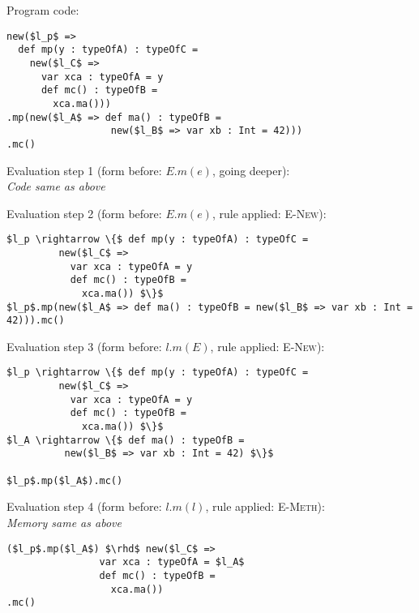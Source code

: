 \documentclass{llncs}
\begin{document}
\newpage

\noindent\underline{}

\vspace{16pt}

\noindent Program code:
\vspace{-6pt}
\begin{lstlisting}[xleftmargin=20pt]
new($l_p$ =>
  def mp(y : typeOfA) : typeOfC =
    new($l_C$ =>
      var xca : typeOfA = y
      def mc() : typeOfB =
        xca.ma()))
.mp(new($l_A$ => def ma() : typeOfB =
                  new($l_B$ => var xb : Int = 42)))
.mc()
\end{lstlisting}

\vspace{12pt}
\noindent Evaluation step 1 (form before: $E.m(e)$, going deeper):\\
\indent\textit{Code same as above}

\vspace{12pt}
\noindent Evaluation step 2 (form before: $E.m(e)$, rule applied: \textsc{E-New}):
\vspace{-6pt}
\begin{lstlisting}[xleftmargin=20pt]
$l_p \rightarrow \{$ def mp(y : typeOfA) : typeOfC =
         new($l_C$ =>
           var xca : typeOfA = y
           def mc() : typeOfB =
             xca.ma()) $\}$
$l_p$.mp(new($l_A$ => def ma() : typeOfB = new($l_B$ => var xb : Int = 42))).mc()
\end{lstlisting}

\vspace{12pt}
\noindent Evaluation step 3 (form before: $l.m(E)$, rule applied: \textsc{E-New}):
\vspace{-6pt}
\begin{lstlisting}[xleftmargin=20pt]
$l_p \rightarrow \{$ def mp(y : typeOfA) : typeOfC =
         new($l_C$ =>
           var xca : typeOfA = y
           def mc() : typeOfB =
             xca.ma()) $\}$
$l_A \rightarrow \{$ def ma() : typeOfB =
          new($l_B$ => var xb : Int = 42) $\}$

$l_p$.mp($l_A$).mc()
\end{lstlisting}

\vspace{12pt}
\noindent Evaluation step 4 (form before: $l.m(l)$, rule applied: \textsc{E-Meth}):\\
\vspace{-6pt}
\indent\textit{Memory same as above}\\
\vspace{-6pt}
\begin{lstlisting}[xleftmargin=20pt]
($l_p$.mp($l_A$) $\rhd$ new($l_C$ =>
                var xca : typeOfA = $l_A$
                def mc() : typeOfB =
                  xca.ma())
.mc()
\end{lstlisting}
\end{document}

